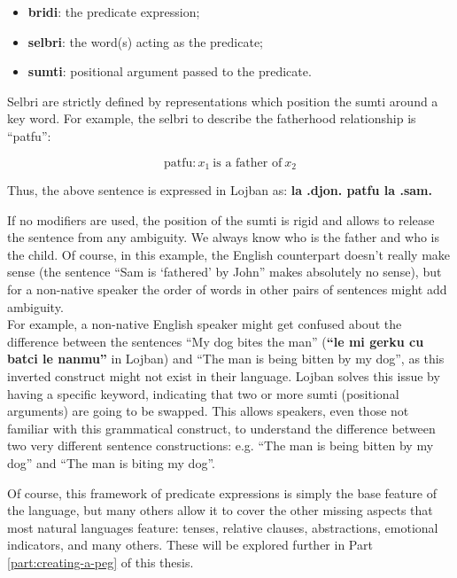 \begin{itemize}
    \item \textbf{bridi}: the predicate expression;
    \item \textbf{selbri}: the word(s) acting as the predicate;
    \item \textbf{sumti}: positional argument passed to the predicate.
\end{itemize}

Selbri are strictly defined by representations which position the sumti around a key word. For example, the selbri to describe the fatherhood relationship is ``patfu'':

$$\text{patfu}: x_1 \: \text{is a father of} \: x_2$$

Thus, the above sentence is expressed in Lojban as: \textbf{la .djon. patfu la .sam.} \newline

If no modifiers are used, the position of the sumti is rigid and allows to release the sentence from any ambiguity. We always know who is the father and who is the child.
Of course, in this example, the English counterpart doesn't really make sense (the sentence ``Sam is `fathered' by John'' makes absolutely no sense), but for a non-native speaker
the order of words in other pairs of sentences might add ambiguity.\\

For example, a non-native English speaker might get confused about the difference between the sentences ``My dog bites the man''
(\textbf{``le mi gerku cu batci le nanmu''} in Lojban) and ``The man is being bitten by my dog'', as this inverted construct might not exist in their language.
Lojban solves this issue by having a specific keyword, indicating that two or more sumti (positional arguments) are going to be swapped. This allows speakers, even those not
familiar with this grammatical construct, to understand the difference between two very different sentence constructions: e.g. ``The man is being bitten by my dog''
and ``The man is biting my dog''.\newline

Of course, this framework of predicate expressions is simply the base feature of the language, but many others allow it to cover the other missing aspects that most natural
languages feature: tenses, relative clauses, abstractions, emotional indicators, and many others. These will be explored further in Part \ref{part:creating-a-peg} of this thesis. \newline

